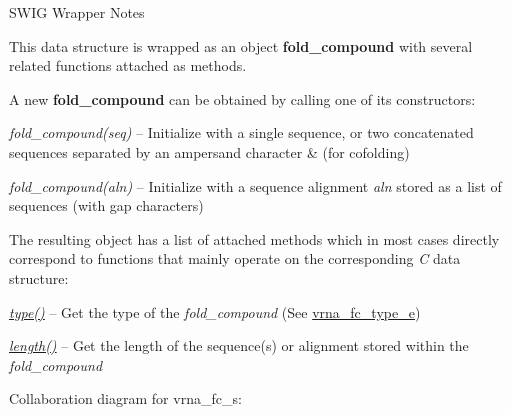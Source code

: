 \begin{DoxyRefDesc}{S\+W\+I\+G Wrapper Notes}
\item[\mbox{\hyperlink{wrappers__wrappers000081}{S\+W\+I\+G Wrapper Notes}}]

This data structure is wrapped as an object {\bfseries{fold\+\_\+compound}} with several related functions attached as methods.

A new {\bfseries{fold\+\_\+compound}} can be obtained by calling one of its constructors\+:~\newline

\begin{DoxyItemize}
\item {\itshape fold\+\_\+compound(seq)} -- Initialize with a single sequence, or two concatenated sequences separated by an ampersand character \textquotesingle{}\&\textquotesingle{} (for cofolding)
\item {\itshape fold\+\_\+compound(aln)} -- Initialize with a sequence alignment {\itshape aln} stored as a list of sequences (with gap characters)
\end{DoxyItemize}The resulting object has a list of attached methods which in most cases directly correspond to functions that mainly operate on the corresponding {\itshape C} data structure\+:~\newline

\begin{DoxyItemize}
\item {\itshape \mbox{\hyperlink{group__fold__compound_a391bcf8ac5997784aaf780cdd251c464}{type()}}} -- Get the type of the {\itshape fold\+\_\+compound} (See \mbox{\hyperlink{group__fold__compound_ga01a4ff86fa71deaaa5d1abbd95a1447d}{vrna\+\_\+fc\+\_\+type\+\_\+e}})
\item {\itshape \mbox{\hyperlink{group__fold__compound_a95fbfed770b858e50c766505dc4bf998}{length()}}} -- Get the length of the sequence(s) or alignment stored within the {\itshape fold\+\_\+compound} 
\end{DoxyItemize}\end{DoxyRefDesc}


Collaboration diagram for vrna\+\_\+fc\+\_\+s\+:
